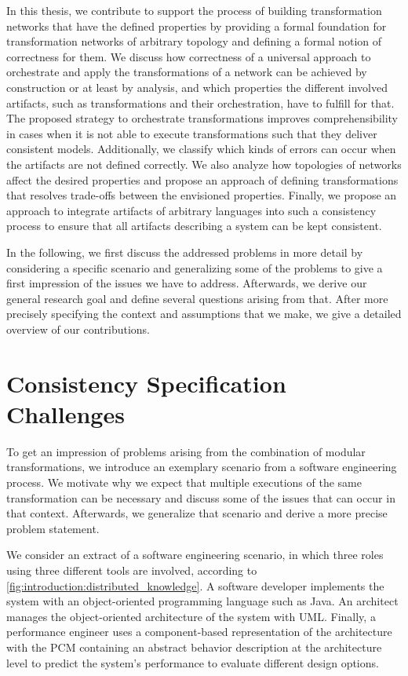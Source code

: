 In this thesis, we contribute to support the process of building transformation networks that have the defined properties by providing a formal foundation for transformation networks of arbitrary topology and defining a formal notion of correctness for them.
We discuss how correctness of a universal approach to orchestrate and apply the transformations of a network can be achieved by construction or at least by analysis, and which properties the different involved artifacts, such as transformations and their orchestration, have to fulfill for that.
The proposed strategy to orchestrate transformations improves comprehensibility in cases when it is not able to execute transformations such that they deliver consistent models.
Additionally, we classify which kinds of errors can occur when the artifacts are not defined correctly.
We also analyze how topologies of networks affect the desired properties and propose an approach of defining transformations that resolves trade-offs between the envisioned properties.
Finally, we propose an approach to integrate artifacts of arbitrary languages into such a consistency process to ensure that all artifacts describing a system can be kept consistent.

In the following, we first discuss the addressed problems in more detail by considering a specific scenario and generalizing some of the problems to give a first impression of the issues we have to address.
Afterwards, we derive our general research goal and define several questions arising from that.
After more precisely specifying the context and assumptions that we make, we give a detailed overview of our contributions.



\section{Consistency Specification Challenges}

To get an impression of problems arising from the combination of modular transformations, we introduce an exemplary scenario from a software engineering process.
We motivate why we expect that multiple executions of the same transformation can be necessary and discuss some of the issues that can occur in that context.
Afterwards, we generalize that scenario and derive a more precise problem statement.

We consider an extract of a software engineering scenario, in which three roles using three different tools are involved, according to \autoref{fig:introduction:distributed_knowledge}. 
A software developer implements the system with an object-oriented programming language such as Java.
An architect manages the object-oriented architecture of the system with \gls{UML}. 
Finally, a performance engineer uses a component-based representation of the architecture with the \gls{PCM} containing an abstract behavior description at the architecture level to predict the system's performance to evaluate different design options.

